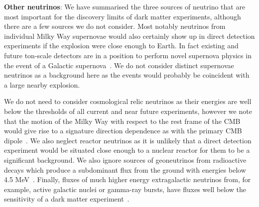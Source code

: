 {\bf Other neutrinos}: We have summarised the three sources of neutrino that are most important for the discovery limits of dark matter experiments, although there are a few sources we do not consider. Most notably neutrinos from individual Milky Way supernovae would also certainly show up in direct detection experiments if the explosion were close enough to Earth. In fact existing and future ton-scale detectors are in a position to perform novel supernova physics in the event of a Galactic supernova~\cite{Lang:2016zhv}. We do not consider distinct supernovae neutrinos as a background here as the events would probably be coincident with a large nearby explosion.

We do not need to consider cosmological relic neutrinos as their energies are well below the thresholds of all current and near future experiments, however we note that the motion of the Milky Way with respect to the rest frame of the CMB would give rise to a signature direction dependence as with the primary CMB dipole~\cite{Safdi:2014rza,Domcke:2017aqj}.
We also neglect reactor neutrinos as it is unlikely that a direct detection experiment would be situated close enough to a nuclear reactor for them to be a significant background. We also ignore sources of geoneutrinos from radioactive decays which produce a subdominant flux from the ground with energies below 4.5 MeV~\cite{Monroe:2007xp}. Finally, fluxes of much higher energy extragalactic neutrinos from, for example, active galactic nuclei or gamma-ray bursts, have fluxes well below the sensitivity of a dark matter experiment~\cite{Gaisser:1994yf,Halzen:2002pg,Aartsen:2014gkd}.



